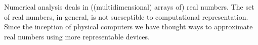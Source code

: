 Numerical analysis deals in ((multidimensional) arrays of) real numbers. The
set of real numbers, in general, is not sucseptible to computational
representation\cite{turing-1936-7}. Since the inception of physical computers
we have thought ways to approximate real numbers using more representable
devices.

\begin{thebibliography}{9}


\end{thebibliography}
